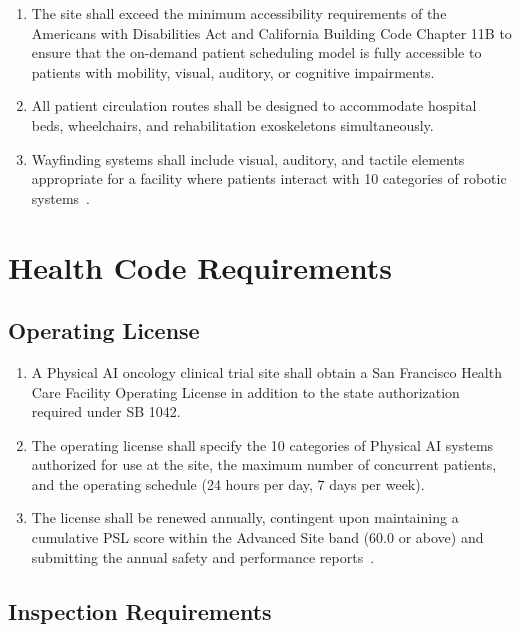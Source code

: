 \documentclass[11pt,letterpaper]{article}
\begin{document}
\begin{enumerate}[label=(\alph*)]
\item The site shall exceed the minimum accessibility requirements of the
  Americans with Disabilities Act and California Building Code Chapter 11B
  to ensure that the on-demand patient scheduling model is fully accessible
  to patients with mobility, visual, auditory, or cognitive impairments.

\item All patient circulation routes shall be designed to accommodate hospital
  beds, wheelchairs, and rehabilitation exoskeletons simultaneously.

\item Wayfinding systems shall include visual, auditory, and tactile elements
  appropriate for a facility where patients interact with 10 categories of
  robotic systems~\cite{patientinstructions2026}.
\end{enumerate}

\section{Health Code Requirements}

\subsection{Operating License}

\begin{enumerate}[label=(\alph*)]
\item A Physical AI oncology clinical trial site shall obtain a San Francisco
  Health Care Facility Operating License in addition to the state authorization
  required under SB 1042.

\item The operating license shall specify the 10 categories of Physical AI
  systems authorized for use at the site, the maximum number of concurrent
  patients, and the operating schedule (24 hours per day, 7 days per week).

\item The license shall be renewed annually, contingent upon maintaining a
  cumulative PSL score within the Advanced Site band (60.0 or above) and
  submitting the annual safety and performance
  reports~\cite{pslframework2026}.
\end{enumerate}

\subsection{Inspection Requirements}
\end{document}

